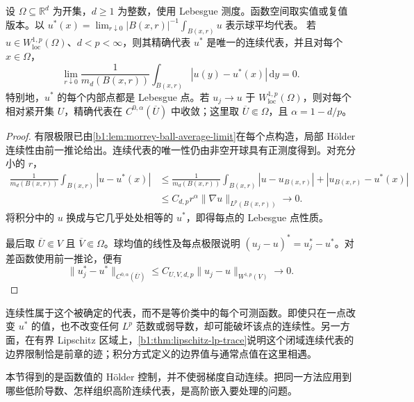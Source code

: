 \begin{proposition}\label{b1:prop:morrey-precise-representative}
设 \(\Omega\subseteq\mathbb R^d\) 为开集，\(d\geq1\) 为整数，使用 Lebesgue 测度。函数空间取实值或复值版本。以 \(u^*(x)=\lim_{r\downarrow0}|B(x,r)|^{-1}\int_{B(x,r)}u\) 表示球平均代表。
若 \(u\in W^{1,p}_{\mathrm{loc}}(\Omega)\)、\(d<p<\infty\)，则其精确代表 \(u^*\) 是唯一的连续代表，并且对每个 \(x\in\Omega\)，
\[
 \lim_{r\downarrow0}\frac1{m_d(B(x,r))}
       \int_{B(x,r)}|u(y)-u^*(x)|\,\mathrm dy=0.
\]
特别地，\(u^*\) 的每个内部点都是 Lebesgue 点。若 \(u_j\to u\) 于 \(W^{1,p}_{\mathrm{loc}}(\Omega)\)，则对每个相对紧开集 \(U\)，精确代表在 \(C^{0,\alpha}(\overline U)\) 中收敛；这里取 \(\overline U\Subset\Omega\)，且 \(\alpha=1-d/p\)。
\end{proposition}
\begin{proof}
有限极限已由\cref{b1:lem:morrey-ball-average-limit}在每个点构造，局部 Hölder 连续性由前一推论给出。连续代表的唯一性仍由非空开球具有正测度得到。对充分小的 \(r\)，
\[
 \begin{split}
 \frac1{m_d(B(x,r))}\int_{B(x,r)}|u-u^*(x)|
 &\le\frac1{m_d(B(x,r))}\int_{B(x,r)}|u-u_{B(x,r)}|
       +|u_{B(x,r)}-u^*(x)|\\
 &\le C_{d,p}r^\alpha
                 \|\nabla u\|_{L^p(B(x,r))}
 \longrightarrow0.
 \end{split}
\]
将积分中的 \(u\) 换成与它几乎处处相等的 \(u^*\)，即得每点的 Lebesgue 点性质。

最后取 \(\overline U\Subset V\) 且 \(\overline V\Subset\Omega\)。球均值的线性及每点极限说明
\((u_j-u)^*=u_j^*-u^*\)。对差函数使用前一推论，便有
\[
 \|u_j^*-u^*\|_{C^{0,\alpha}(\overline U)}
 \le C_{U,V,d,p}\|u_j-u\|_{W^{1,p}(V)}
 \longrightarrow0.
\]
\end{proof}

连续性属于这个被确定的代表，而不是等价类中的每个可测函数。即使只在一点改变 \(u^*\) 的值，也不改变任何 \(L^p\) 范数或弱导数，却可能破坏该点的连续性。另一方面，在有界 Lipschitz 区域上，\cref{b1:thm:lipschitz-lp-trace}说明这个闭域连续代表的边界限制恰是前章的迹；积分方式定义的边界值与通常点值在这里相遇。

\ProseParagraphBreak

本节得到的是函数值的 Hölder 控制，并不使弱梯度自动连续。把同一方法应用到哪些低阶导数、怎样组织高阶连续代表，是高阶嵌入要处理的问题。
